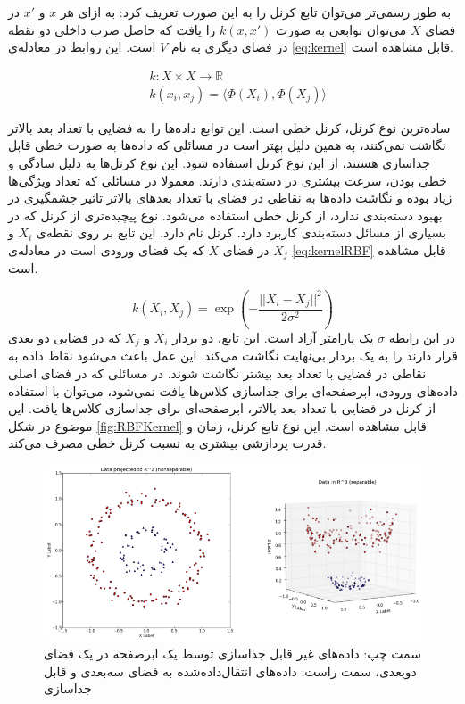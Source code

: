 به طور رسمی‌تر می‌توان تابع کرنل را به این صورت تعریف کرد: به ازای هر  $x$  و $x'$ در فضای $X$ می‌توان توابعی به صورت $k(x, x')$ را یافت که حاصل ضرب داخلی دو نقطه در فضای دیگری به نام $V$ است. این روابط در معادله‌ی \ref{eq:kernel} قابل مشاهده است.\cite{KernelSVM} 

\begin{equation}
\begin{split}
	& k: X \times X \to \mathbb{R} \\
	& k(x_i, x_j) = \bigg \langle \Phi (X_i), \Phi(X_j) \bigg \rangle
\end{split}
\label{eq:kernel}
\end{equation}

ساده‌ترین نوع کرنل، کرنل خطی است. این توابع  داده‌ها را به فضایی با تعداد بعد بالاتر نگاشت نمی‌کنند، به همین دلیل بهتر است در مسائلی که داده‌ها به صورت خطی قابل جداسازی هستند، از این نوع کرنل استفاده شود. 
 این نوع کرنل‌ها به دلیل سادگی و خطی بودن، سرعت بیشتری در دسته‌بندی دارند. معمولا در مسائلی که تعداد ویژگی‌ها زیاد بوده و نگاشت داده‌ها به نقاطی در فضای با تعداد بعدهای بالاتر تاثیر چشمگیری در بهبود دسته‌بندی ندارد، از کرنل خطی استفاده می‌شود. \cite{LinearSVM} 
 نوع پیچیده‌تری از کرنل که در بسیاری از مسائل دسته‌بندی کاربرد دارد. کرنل  نام دارد. این تابع بر روی نقطه‌ی $X_i$ و $X_j$ در فضای $X$ که یک فضای ورودی است در معادله‌ی \ref{eq:kernelRBF} قابل مشاهده است.\cite{kernelRBF}
   
\begin{equation}
	 k(X_i, X_j) = \exp(-\frac{{||X_i-X_j||}^2}{2\sigma^2})
\label{eq:kernelRBF}
\end{equation}
در این رابطه $\sigma$ یک پارامتر آزاد است. این تابع، دو بردار $X_i$  و $X_j$ که در فضایی دو بعدی قرار دارند را به یک بردار بی‌نهایت نگاشت می‌کند. این عمل باعث می‌شود نقاط داده به نقاطی در فضایی با تعداد بعد بیشتر نگاشت شوند. در مسائلی که در فضای اصلی داده‌های ورودی، ابرصفحه‌ای برای جداسازی کلاس‌ها یافت نمی‌شود، می‌توان با استفاده از کرنل  در فضایی با تعداد بعد بالاتر، ابرصفحه‌ای برای جداسازی کلاس‌ها یافت. این موضوع در شکل \ref{fig:RBFKernel} قابل مشاهده است. این نوع تابع کرنل، زمان و قدرت پردازشی بیشتری به نسبت کرنل خطی مصرف می‌کند.

\begin{figure}
\centering
\includegraphics[width=15cm]{Figures/RBFKernel.png}
\caption{ سمت چپ: داده‌های غیر قابل جداسازی توسط یک ابرصفحه در یک فضای دوبعدی، سمت راست: داده‌های انتقال‌داده‌شده به فضای سه‌بعدی و قابل جداسازی\cite{TowardsScienceRBF}}
\label{fig:SVMClassification}
\end{figure}

